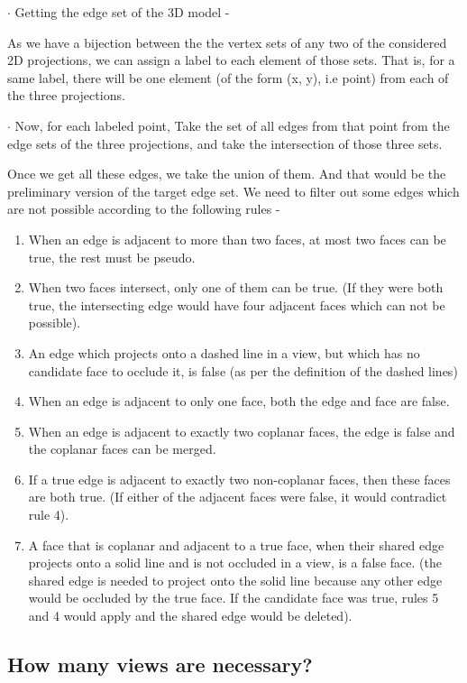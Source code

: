 \documentclass[12pt]{article}
\begin{document}
$\cdot$ Getting the edge set of the 3D model -

As we have a bijection between the the vertex sets of any two of the considered 2D projections, we can assign a label to each element of those sets. That is, for a same label, there will be one element (of the form (x, y), i.e point) from each of the three projections. 

$\cdot$ Now, for each labeled point, 
	Take the set of all edges from that point from the edge sets of the three projections, and take the intersection of those three sets.
    
Once we get all these edges, we take the union of them. And that would be the preliminary version of the target edge set. We need to filter out some edges which are not possible according to the following rules -

\begin{enumerate}
\item When an edge is adjacent to more than two faces, at most two faces can be true, the rest must be pseudo.
\item When two faces intersect, only one of them can be true. (If they were both true, the intersecting edge would have four adjacent faces which can not be possible).
\item An edge which projects onto a dashed line in a view, but which has no candidate face to occlude it, is false (as per the definition of the dashed lines)
\item When an edge is adjacent to only one face, both the edge and face are false.
\item When an edge is adjacent to exactly two coplanar faces, the edge is false and the coplanar faces can be merged.
\item If a true edge is adjacent to exactly two non-coplanar faces, then these faces are both true. (If either of the adjacent faces were false, it would contradict rule 4).
\item A face that is coplanar and adjacent to a true face, when their shared edge projects onto a solid line and is not occluded in a view, is a false face. (the shared edge is needed to project onto the solid line because any other edge would be occluded by the true face. If the candidate face was true, rules 5 and 4 would apply and the shared edge would be deleted).

\end{enumerate}

\subsection{How many views are necessary?}
\end{document}
